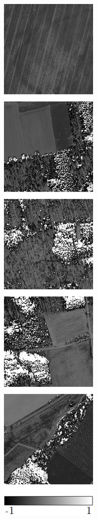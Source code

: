\begin{figure}
\begin{subfigure}{\VegetationImageWidth}
        \caption{}
        \label{fig:svi_ndvi}
    \end{subfigure} \hspace{2mm}
    \begin{subfigure}{\VegetationImageWidth}
        \includegraphics[width=\textwidth]{images/vegetation/evi}

\end{subfigure}
\end{figure}
